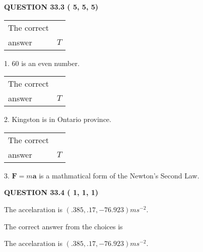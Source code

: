 \documentclass[12pt]{article}
\begin{document}
{\textbf{\Large{QUESTION
33.3 
 (          5,          5,          5)
}}}
  
  
 
 
\noindent{}

 
\noindent\begin{tabular}{|l|l|}\hline The correct & \\
          answer &  %
$T$ \\ \hline \end{tabular}
1. $ %
60$ is an  %
even number.
 
\noindent\begin{tabular}{|l|l|}\hline The correct & \\
          answer &  %
$T$ \\ \hline \end{tabular}
2.  %
Kingston is in  %
Ontario province.
 
\noindent\begin{tabular}{|l|l|}\hline The correct & \\
          answer &  %
$T$ \\ \hline \end{tabular}
3.  %
$\mathbf{F}=m\mathbf{a}$ is a mathmatical form of  %
the Newton's Second Law.
 
 
 
  
\vspace{0.2in}
  
{\textbf{\Large{QUESTION
33.4 
 (          1,          1,          1)
}}}
  
  


 
 
\noindent{}
 
 
The accelaration is $  %
(
.385,
.17,
-76.923)
ms^{-2} $.
 
 
 
 
 
 
\noindent{}

The correct answer from the choices is


The accelaration is $  %
(
.385,
.17,
-76.923)
ms^{-2} $.
 
 
 
 
 
\noindent{}
\end{document}
